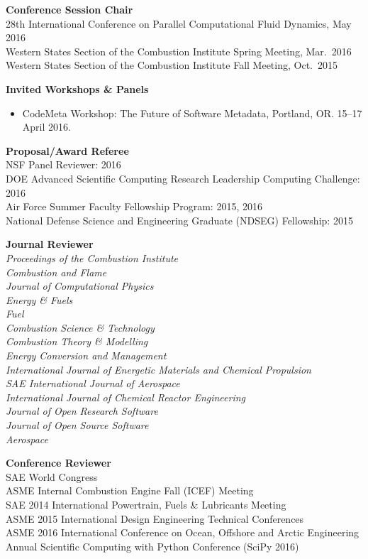 \documentclass[margin,line,11pt]{res}
\begin{document}
\begin{resume}
\textbf{Conference Session Chair} \\
28th International Conference on Parallel Computational Fluid Dynamics, May 2016 \\
Western States Section of the Combustion Institute Spring Meeting, Mar.\ 2016 \\
Western States Section of the Combustion Institute Fall Meeting, Oct.\ 2015

\textbf{Invited Workshops \& Panels}
\begin{itemize}[leftmargin=*]
\item CodeMeta Workshop: The Future of Software Metadata, Portland, OR. 15--17 April 2016.
\end{itemize}

\textbf{Proposal\slash Award Referee} \\
NSF Panel Reviewer: 2016 \\
DOE Advanced Scientific Computing Research Leadership Computing Challenge: 2016 \\
Air Force Summer Faculty Fellowship Program: 2015, 2016 \\
National Defense Science and Engineering Graduate (NDSEG) Fellowship: 2015

\textbf{Journal Reviewer} \\
\emph{Proceedings of the Combustion Institute}\\
\emph{Combustion and Flame}\\
\emph{Journal of Computational Physics}\\
\emph{Energy \& Fuels}\\
\emph{Fuel}\\
\emph{Combustion Science \& Technology}\\
\emph{Combustion Theory \& Modelling}\\
\emph{Energy Conversion and Management}\\
\emph{International Journal of Energetic Materials and Chemical Propulsion}\\
\emph{SAE International Journal of Aerospace}\\
\emph{International Journal of Chemical Reactor Engineering} \\
\emph{Journal of Open Research Software} \\
\emph{Journal of Open Source Software} \\
\emph{Aerospace}

\textbf{Conference Reviewer} \\
SAE World Congress\\
ASME Internal Combustion Engine Fall (ICEF) Meeting\\
SAE 2014 International Powertrain, Fuels \& Lubricants Meeting \\
ASME 2015 International Design Engineering Technical Conferences \\
ASME 2016  International Conference on Ocean, Offshore and Arctic Engineering \\
 Annual Scientific Computing with Python Conference (SciPy 2016)


\end{resume}
\end{document}
